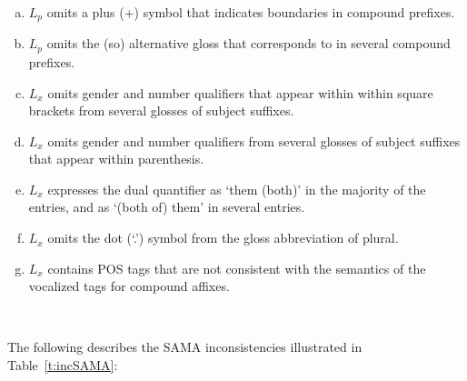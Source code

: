 \begin{enumerate}[(a)]
\item \label{inc:plus}  $L_p$ omits a plus (+) symbol that indicates boundaries in compound prefixes. 
\item \label{inc:so}    $L_p$ omits the (so) alternative gloss that corresponds to  in several compound prefixes.
\item \label{inc:num_gender_subject} $L_x$ omits gender and number qualifiers 
  that appear within within square brackets
    from several glosses of subject suffixes.
\item \label{inc:num_gender_object} $L_x$ omits gender and number qualifiers 
    from several glosses of subject suffixes that appear within parenthesis.
\item \label{inc:both} $L_x$
    expresses the dual quantifier as `them (both)' in the majority of the entries, and 
    as `(both of) them' in several entries.
\item \label{inc:dot} $L_x$ omits the dot (`.') symbol from the gloss abbreviation of plural.
\item \label{inc:pos} $L_x$ contains POS tags that are not consistent with the semantics of the vocalized tags for compound affixes.
\end{enumerate}
\



The following describes the SAMA inconsistencies illustrated in Table~\ref{t:incSAMA}:

\arabtrue

